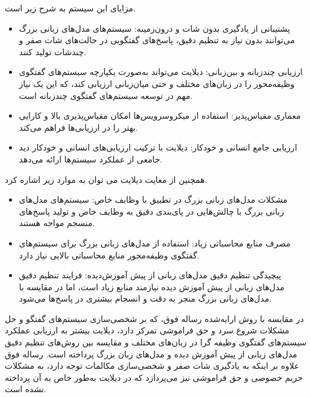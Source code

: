 \begin{enumerate}
 مزایای این سیستم به شرح زیر است.
\begin{itemize}
\item
پشتیبانی از یادگیری بدون شات و درون‌زمینه: سیستم‌های مدل‌های زبانی بزرگ می‌توانند بدون نیاز به تنظیم دقیق، پاسخ‌های گفتگویی در حالت‌های شات صفر و چندشات تولید کنند.
\item
ارزیابی چندزبانه و بین‌زبانی: دیلایت می‌تواند به‌صورت یکپارچه سیستم‌های گفتگوی وظیفه‌محور را در زبان‌های مختلف و حتی میان‌زبانی ارزیابی کند، که این یک نیاز مهم در توسعه سیستم‌های گفتگوی چندزبانه است.
\item
معماری مقیاس‌پذیر: استفاده از میکروسرویس‌ها امکان مقیاس‌پذیری بالا و کارایی بهتر را در ارزیابی‌ها فراهم می‌کند.
\item
ارزیابی جامع انسانی و خودکار: دیلایت با ترکیب ارزیابی‌های انسانی و خودکار دید جامعی از عملکرد سیستم‌ها ارائه می‌دهد.
\end{itemize}

همچنین از معایت دیلایت می توان به موارد زیر اشاره کرد.
\begin{itemize}
\item
مشکلات مدل‌های زبانی بزرگ در تطبیق با وظایف خاص: سیستم‌های مدل‌های زبانی بزرگ با چالش‌هایی در پای‌بندی دقیق به وظایف خاص و تولید پاسخ‌های منسجم مواجه هستند.
\item
مصرف منابع محاسباتی زیاد: استفاده از مدل‌های زبانی بزرگ برای سیستم‌های گفتگوی وظیفه‌محور منابع محاسباتی بالایی نیاز دارد.
\item
پیچیدگی تنظیم دقیق مدل‌های زبانی از پیش آموزش‌دیده: فرایند تنظیم دقیق مدل‌های زبانی از پیش آموزش دیده نیازمند منابع زیاد است، اما در مقایسه با مدل‌های زبانی بزرگ منجر به دقت و انسجام بیشتری در پاسخ‌ها می‌شود.
\end{itemize}

در مقایسه با روش ارایه‌شده رساله فوق، که بر شخصی‌سازی سیستم‌های گفتگو و حل مشکلات شروع سرد و حق فراموشی تمرکز دارد، دیلایت بیشتر به ارزیابی عملکرد سیستم‌های گفتگوی وظیفه گرا در زبان‌های مختلف و مقایسه بین روش‌های تنظیم دقیق مدل‌های زبانی از پیش آموزش دیده و مدل‌های زبان بزرگ پرداخته است. رساله فوق علاوه بر اینکه به یادگیری شات صفر و شخصی‌سازی مکالمات توجه دارد، به مشکلات حریم خصوصی و حق فراموشی نیز می‌پردازد که در دیلایت به‌طور خاص به آن پرداخته نشده است. \\


\end{enumerate}
